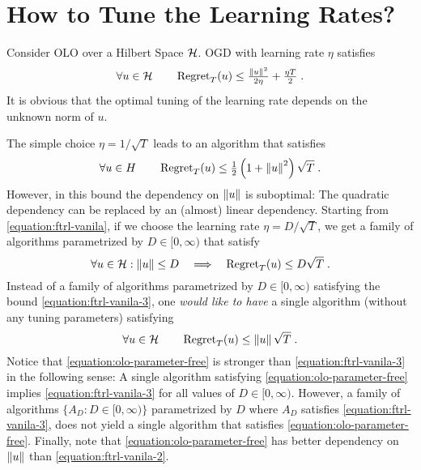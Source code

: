 \section{How to Tune the Learning Rates?}
\label{section:learning-rates}

Consider \ac{OLO} over a Hilbert Space $\mathcal{H}$. \ac{OGD} with learning rate
$\eta$ satisfies~\citep{Shalev-Shwartz-2011}
\begin{equation}
\label{equation:ftrl-vanila}
\forall u \in \mathcal{H} \qquad \operatorname{Regret}_T(u) \le \tfrac{\left\|{u}\right\|^2}{2\eta} + \tfrac{\eta T}{2} \; .
\end{equation}
It is obvious that the optimal tuning of the learning rate depends on the
unknown norm of $u$.

The simple choice $\eta = 1/\sqrt{T}$ leads to an algorithm that satisfies
\begin{equation}
\label{equation:ftrl-vanila-2}
\forall u \in H \qquad \operatorname{Regret}_T(u) \le \tfrac{1}{2}\left(1+\left\|{u}\right\|^2\right)\sqrt{T} \; .
\end{equation}
However, in this bound the dependency on $\left\|{u}\right\|$ is suboptimal: The
quadratic dependency can be replaced by an (almost) linear dependency.
Starting from \eqref{equation:ftrl-vanila}, if we choose the learning rate
$\eta = D/\sqrt{T}$, we get a family of algorithms parametrized by $D \in
[0,\infty)$ that satisfy
\begin{equation}
\label{equation:ftrl-vanila-3}
\forall u \in \mathcal{H} : \left\|{u}\right\| \le D \quad  \Longrightarrow \quad \operatorname{Regret}_T(u) \le D \sqrt{T} \; .
\end{equation}
Instead of a family of algorithms parametrized by $D \in [0,\infty)$ satisfying
the bound \eqref{equation:ftrl-vanila-3}, one \emph{would like
to have} a single algorithm (without any tuning parameters) satisfying
\begin{equation}
\label{equation:olo-parameter-free}
\forall u \in \mathcal{H} \qquad \operatorname{Regret}_T(u) \le \left\|{u}\right\| \sqrt{T} \; .
\end{equation}
Notice that \eqref{equation:olo-parameter-free} is stronger than
\eqref{equation:ftrl-vanila-3} in the following sense: A single algorithm
satisfying \eqref{equation:olo-parameter-free} implies
\eqref{equation:ftrl-vanila-3} for all values of $D \in [0,\infty)$. However,
a family of algorithms $\{A_D : D \in [0,\infty)\}$ parametrized by $D$ where
$A_D$ satisfies \eqref{equation:ftrl-vanila-3}, does not yield a single
algorithm that satisfies \eqref{equation:olo-parameter-free}.  Finally, note
that \eqref{equation:olo-parameter-free} has better dependency on $\left\|{u}\right\|$
than \eqref{equation:ftrl-vanila-2}.

